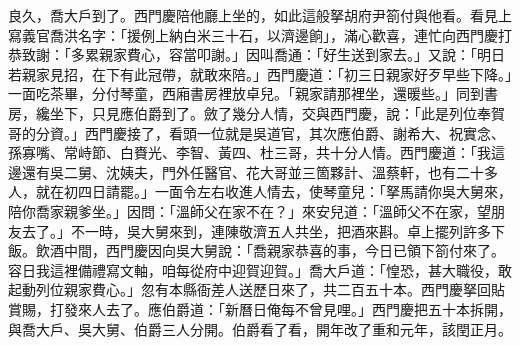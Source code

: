良久，喬大戶到了。西門慶陪他廳上坐的，如此這般拏胡府尹箚付與他看。看見上寫義官喬洪名字：「援例上納白米三十石，以濟邊餉」，滿心歡喜，連忙向西門慶打恭致謝：「多累親家費心，容當叩謝。」{}因叫喬通：「好生送到家去。」又說：「明日若親家見招，在下有此冠帶，就敢來陪。」西門慶道：「初三日親家好歹早些下降。」一面吃茶畢，分付琴童，西廂書房裡放卓兒。「親家請那裡坐，還暖些。」同到書房，纔坐下，只見應伯爵到了。斂了幾分人情，交與西門慶，說：「此是列位奉賀哥的分資。」西門慶接了，看頭一位就是吳道官，其次應伯爵、謝希大、祝實念、孫寡嘴、常峙節、白賚光、李智、黃四、杜三哥，共十分人情。西門慶道：「我這邊還有吳二舅、沈姨夫，門外任醫官、花大哥並三箇夥計、溫蔡軒，也有二十多人，就在初四日請罷。」一面令左右收進人情去，使琴童兒：「拏馬請你吳大舅來，陪你喬家親爹坐。」因問：「溫師父在家不在？」來安兒道：「溫師父不在家，望朋友去了。」不一時，吳大舅來到，連陳敬濟五人共坐，把酒來斟。卓上擺列許多下飯。飲酒中間，西門慶因向吳大舅說：「喬親家恭喜的事，今日已領下箚付來了。容日我這裡備禮寫文軸，咱每從府中迎賀迎賀。」喬大戶道：「惶恐，甚大職役，敢起動列位親家費心。」忽有本縣衙差人送歷日來了，共二百五十本。西門慶拏回貼賞賜，打發來人去了。應伯爵道：「新曆日俺每不曾見哩。」西門慶把五十本拆開，與喬大戶、吳大舅、伯爵三人分開。伯爵看了看，開年改了重和元年，該閏正月。

